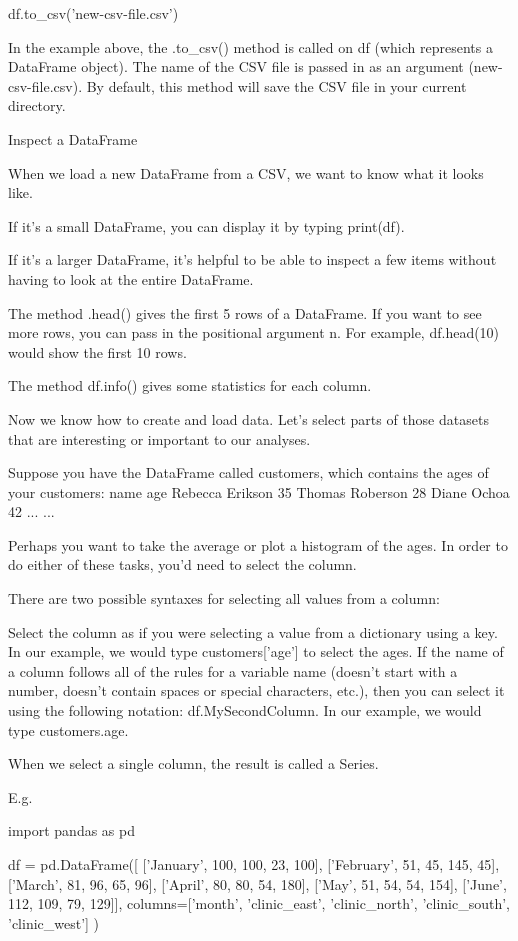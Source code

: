\documentclass{journal}
\begin{document}
df.to_csv('new-csv-file.csv')

In the example above, the .to_csv() method is called on df (which represents a DataFrame object). The name of the CSV file is passed in as an argument (new-csv-file.csv). By default, this method will save the CSV file in your current directory.


Inspect a DataFrame

When we load a new DataFrame from a CSV, we want to know what it looks like.

If it's a small DataFrame, you can display it by typing print(df).

If it's a larger DataFrame, it's helpful to be able to inspect a few items without having to look at the entire DataFrame.

The method .head() gives the first 5 rows of a DataFrame. If you want to see more rows, you can pass in the positional argument n. For example, df.head(10) would show the first 10 rows.

The method df.info() gives some statistics for each column.


Now we know how to create and load data. Let's select parts of those datasets that are interesting or important to our analyses.

Suppose you have the DataFrame called customers, which contains the ages of your customers:
name 	age
Rebecca Erikson 	35
Thomas Roberson 	28
Diane Ochoa 	42
... 	...

Perhaps you want to take the average or plot a histogram of the ages. In order to do either of these tasks, you'd need to select the column.

There are two possible syntaxes for selecting all values from a column:

    Select the column as if you were selecting a value from a dictionary using a key. In our example, we would type customers['age'] to select the ages.
    If the name of a column follows all of the rules for a variable name (doesn't start with a number, doesn't contain spaces or special characters, etc.), then you can select it using the following notation: df.MySecondColumn. In our example, we would type customers.age.

When we select a single column, the result is called a Series.

E.g.

import pandas as pd

df = pd.DataFrame([
  ['January', 100, 100, 23, 100],
  ['February', 51, 45, 145, 45],
  ['March', 81, 96, 65, 96],
  ['April', 80, 80, 54, 180],
  ['May', 51, 54, 54, 154],
  ['June', 112, 109, 79, 129]],
  columns=['month', 'clinic_east',
           'clinic_north', 'clinic_south',
           'clinic_west']
)
\end{document}
